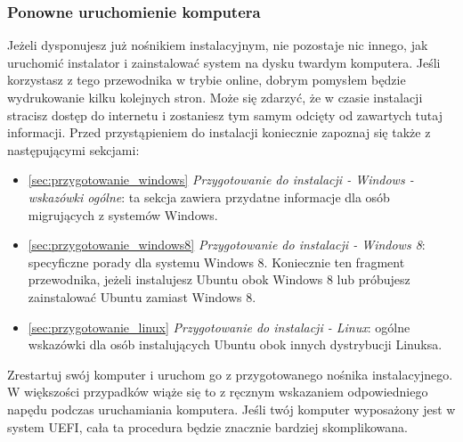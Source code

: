 \subsubsection{Ponowne uruchomienie komputera}
Jeżeli dysponujesz już  nośnikiem instalacyjnym, nie pozostaje nic innego, jak uruchomić instalator i zainstalować system na dysku twardym komputera. Jeśli korzystasz z tego przewodnika w trybie online, dobrym pomysłem będzie wydrukowanie kilku kolejnych stron. Może się zdarzyć, że w czasie instalacji stracisz dostęp do internetu i zostaniesz tym samym odcięty od zawartych tutaj informacji.
Przed przystąpieniem do instalacji koniecznie zapoznaj się także z następującymi sekcjami:
\begin{itemize}
\item \ref{sec:przygotowanie_windows} \textit{Przygotowanie do instalacji - Windows - wskazówki ogólne}: ta sekcja zawiera przydatne informacje dla osób migrujących z systemów Windows.
\item \ref{sec:przygotowanie_windows8} \textit{Przygotowanie do instalacji - Windows 8}: specyficzne porady dla systemu Windows 8. Koniecznie ten fragment przewodnika, jeżeli instalujesz Ubuntu obok Windows 8 lub próbujesz zainstalować Ubuntu zamiast Windows 8.
\item \ref{sec:przygotowanie_linux} \textit{Przygotowanie do instalacji - Linux}: ogólne wskazówki dla osób instalujących Ubuntu obok innych dystrybucji Linuksa.
\end{itemize}
Zrestartuj swój komputer i uruchom go z przygotowanego nośnika instalacyjnego. W większości przypadków wiąże się to z ręcznym wskazaniem odpowiedniego napędu podczas uruchamiania komputera. Jeśli twój komputer wyposażony jest w system UEFI, cała ta procedura będzie znacznie bardziej skomplikowana.
